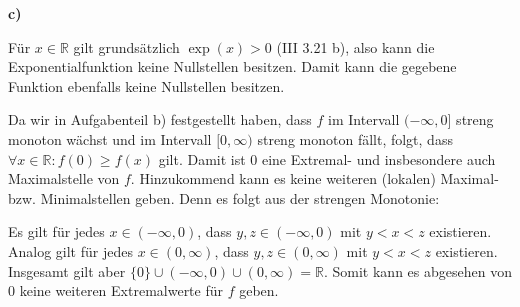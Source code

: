 \documentclass[a4paper,graphics,11pt]{article}
\begin{document}
\textbf{c)}

Für $x \in \mathbb{R}$ gilt grundsätzlich $\exp(x) > 0$ (III 3.21 b), also kann die
Exponentialfunktion keine Nullstellen besitzen. Damit kann die gegebene Funktion
ebenfalls keine Nullstellen besitzen.

Da wir in Aufgabenteil b) festgestellt haben, dass $f$ im Intervall $(-\infty, 0]$
streng monoton wächst und im Intervall $[0, \infty)$ streng monoton fällt, folgt,
dass $\forall x \in \mathbb{R}\colon f(0) \geq f(x)$ gilt. Damit ist 0 eine Extremal-
und insbesondere auch Maximalstelle von $f$. Hinzukommend kann es keine weiteren
(lokalen) Maximal- bzw. Minimalstellen geben. Denn es folgt aus der strengen Monotonie:

Es gilt für jedes $x \in (-\infty, 0)$, dass $y, z \in (-\infty, 0)$ mit $y<x<z$ existieren.
Analog gilt für jedes $x \in (0, \infty)$, dass $y,z \in (0, \infty)$ mit
$y<x<z$ existieren.\\
Insgesamt gilt aber $\{0\}\cup(-\infty,0)\cup(0,\infty) = \mathbb{R}$.
Somit kann es abgesehen von 0 keine weiteren Extremalwerte für $f$ geben.
\end{document}
